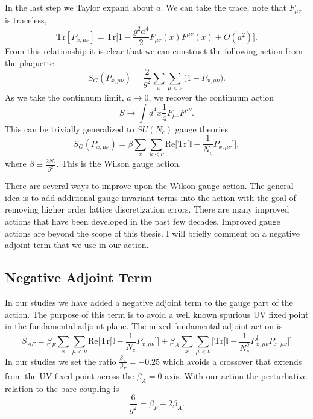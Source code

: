 In the last step we Taylor expand about $a$.
We can take the trace, note that $F_{\mu\nu}$ is traceless,
\begin{equation}
  \mbox{Tr}[P_{x,\mu\nu}]=\mbox{Tr}\Big[1-\frac{g^2a^4}{2}F_{\mu\nu}(x)F^{\mu\nu}(x) + O(a^2)\Big].
\end{equation}
From this relationship it is clear that we can construct the following action from the plaquette
\begin{equation}
  S_G(P_{x,\mu\nu})=\frac{2}{g^2}\sum_{x} \sum_{\mu<\nu} \big(1-P_{x,\mu\nu}\big).
\end{equation}
As we take the continuum limit, $a\rightarrow 0$, we recover the continuum action
\begin{equation}
  S\rightarrow \int d^4x\frac{1}{4}F_{\mu\nu}F^{\mu\nu}.
\end{equation}
This can be trivially generalized to $SU(N_c)$ gauge theories
\begin{equation}
  S_G(P_{x,\mu\nu})=\beta\sum_{x} \sum_{\mu<\nu} \mbox{Re}\Big[\mbox{Tr}\big[\mathbb{I}-\frac{1}{N_c}P_{x,\mu\nu}\big]\Big],
\end{equation}
where $\beta\equiv\frac{2N_c}{g^2}$.
This is the Wilson gauge action.

There are several ways to improve upon the Wilson gauge action.
The general idea is to add additional gauge invariant terms into the action with the goal of removing higher order lattice discretization errors.
There are many improved actions that have been developed in the past few decades.
Improved gauge actions are beyond the scope of this thesis.
I will briefly comment on a negative adjoint term that we use in our action.

\subsection{Negative Adjoint Term}

In our studies we have added a negative adjoint term to the gauge part of the action.
The purpose of this term is to avoid a well known spurious UV fixed point \cite{ac 3,80,4} in the fundamental adjoint plane.
The mixed fundamental-adjoint action is
\begin{equation}
  S_{AF}=\beta_F\sum_{x} \sum_{\mu<\nu} \mbox{Re}\Big[\mbox{Tr}\big[\mathbb{I}-\frac{1}{N_c}P_{x,\mu\nu}\big]\Big] + \beta_A\sum_{x} \sum_{\mu<\nu}\Big[\mbox{Tr}\big[\mathbb{I}-\frac{1}{N_c^2}P_{x,\mu\nu}^\dagger P_{x,\mu\nu}\big]\Big]
\end{equation}
In our studies we set the ratio $\frac{\beta_A}{\beta_F}=-0.25$ which avoids a crossover that extends from the UV fixed point across the $\beta_A=0$ axis.
With our action the perturbative relation to the bare coupling is
\begin{equation}
  \frac{6}{g^2}=\beta_F+2\beta_A.
\end{equation}
